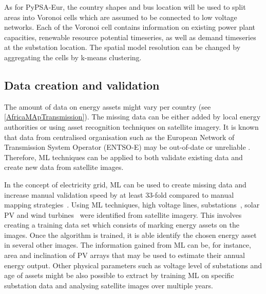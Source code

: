 \documentclass[conference, a4paper]{IEEEtran}
\begin{document}
As for PyPSA-Eur, the country shapes and bus location will be used to split areas into Voronoi cells which are assumed to be connected to low voltage networks. Each of the Voronoi cell contains information on existing power plant capacities, renewable resource potential timeseries, as well as demand timeseries at the substation location. The spatial model resolution can be changed by aggregating the cells by k-means clustering.

\subsection{Data creation and validation} %

The amount of data on energy assets might vary per country (see \cref{AfricaMApTransmission}). The missing data can be either added by local energy authorities or using asset recognition techniques on satellite imagery. It is known that data from centralised organisation such as the European Network of Transmission System Operator (ENTSO-E) may be out-of-date or unreliable \cite{gotzens-heinrichs-ea-2019,PyPSAEur}. Therefore, ML techniques can be applied to both validate existing data and create new data from satellite images.

In the concept of electricity grid, ML can be used to create missing data and increase manual validation speed by at least 33-fold compared to  manual mapping strategies~\cite{developmentseed-2018}. 
Using ML techniques, high voltage lines, substations~\cite{developmentseed-2018}, solar PV \cite{dehoog-maetschke-ea-2020} and wind turbines~\cite{zhou-irvin-ea-2019} were identified from satellite imagery. This involves creating a training data set which consists of marking energy assets on the images. Once the algorithm is trained, it is able identify the chosen energy asset in several other images. The information gained from ML can be, for instance, area and inclination of PV arrays that may be used to estimate their annual energy output. Other physical parameters such as voltage level of substations and age of assets might be also possible to extract by training ML on specific substation data and analysing satellite images over multiple years.
\end{document}
